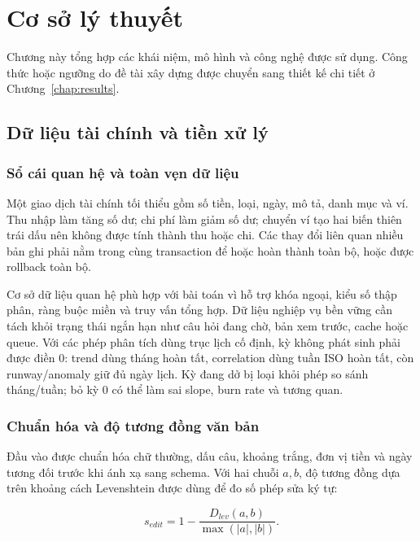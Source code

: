 \chapter{Cơ sở lý thuyết}
\label{chap:theory}

Chương này tổng hợp các khái niệm, mô hình và công nghệ được sử dụng. Công thức hoặc ngưỡng do đề tài xây dựng được chuyển sang thiết kế chi tiết ở Chương~\ref{chap:results}.

\section{Dữ liệu tài chính và tiền xử lý}
\label{sec:fin-data}

\subsection{Sổ cái quan hệ và toàn vẹn dữ liệu}

Một giao dịch tài chính tối thiểu gồm số tiền, loại, ngày, mô tả, danh mục và ví. Thu nhập làm tăng số dư; chi phí làm giảm số dư; chuyển ví tạo hai biến thiên trái dấu nên không được tính thành thu hoặc chi. Các thay đổi liên quan nhiều bản ghi phải nằm trong cùng transaction để hoặc hoàn thành toàn bộ, hoặc được rollback toàn bộ.

Cơ sở dữ liệu quan hệ phù hợp với bài toán vì hỗ trợ khóa ngoại, kiểu số thập phân, ràng buộc miền và truy vấn tổng hợp. Dữ liệu nghiệp vụ bền vững cần tách khỏi trạng thái ngắn hạn như câu hỏi đang chờ, bản xem trước, cache hoặc queue. Với các phép phân tích dùng trục lịch cố định, kỳ không phát sinh phải được điền 0: trend dùng tháng hoàn tất, correlation dùng tuần ISO hoàn tất, còn runway/anomaly giữ đủ ngày lịch. Kỳ đang dở bị loại khỏi phép so sánh tháng/tuần; bỏ kỳ 0 có thể làm sai slope, burn rate và tương quan.

\subsection{Chuẩn hóa và độ tương đồng văn bản}
\label{subsec:text-similarity}

Đầu vào được chuẩn hóa chữ thường, dấu câu, khoảng trắng, đơn vị tiền và ngày tương đối trước khi ánh xạ sang schema. Với hai chuỗi $a,b$, độ tương đồng dựa trên khoảng cách Levenshtein \cite{levenshtein1966} được dùng để đo số phép sửa ký tự:

\begin{equation}
  s_{edit}=1-\frac{D_{lev}(a,b)}{\max(|a|,|b|)}.
\end{equation}

